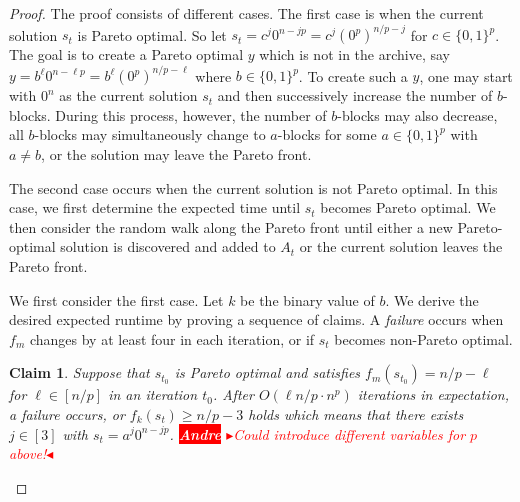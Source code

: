 \documentclass[
sigconf = false, %
review = false, %
screen = true, %
anonymous = true, %
format=acmsmall
]{acmart}
\newtheorem{claim}{Claim}
\newcommand{\nbc}[3]{
		{\colorbox{#3}{\bfseries\sffamily\scriptsize\textcolor{white}{#1}}}
		{\textcolor{#3}{\sf\small$\blacktriangleright$\textit{#2}$\blacktriangleleft$}}
}
\newcommand{\andre}[1]{\nbc{Andre}{#1}{red}}
\begin{document}
\begin{proof}
The proof consists of different cases. The first case is when the current solution $s_t$ is Pareto optimal. So let $s_t= c^j0^{n-j p} = c^j(0^p)^{n/p-j}$ for $c \in \{0,1\}^p$. The goal is to create a Pareto optimal $y$ which is not in the archive, say $y= b^{\ell}0^{n-\ell p} = b^{\ell}(0^p)^{n/p-\ell}$ where $b \in \{0,1\}^p$. To create such a $y$, one may start with $0^n$ as the current solution $s_t$ and then successively increase the number of $b$-blocks. During this process, however, the number of $b$-blocks may also decrease, all $b$-blocks may simultaneously change to $a$-blocks for some $a \in \{0,1\}^p$ with $a \neq b$, or the solution may leave the Pareto front.

The second case occurs when the current solution is not Pareto optimal. In this case, we first determine the expected time until $s_t$ becomes Pareto optimal. We then consider the random walk along the Pareto front until either a new Pareto-optimal solution is discovered and added to $A_t$ or the current solution leaves the Pareto front. 

We first consider the first case. Let $k$ be the binary value of $b$. We derive the desired expected runtime by proving a sequence of claims. A \emph{failure} occurs when $f_m$ changes by at least four in each iteration, or if $s_t$ becomes non-Pareto optimal. 

\begin{claim}
    \label{cl:reachalmostzero}
    Suppose that $s_{t_0}$ is Pareto optimal and satisfies $f_m(s_{t_0})=n/p-\ell$ for $\ell \in [n/p]$ in an iteration $t_0$. After $O(\ell n/p \cdot n^p)$ iterations in expectation, a failure occurs, or $f_k(s_t) \geq n/p-3$ holds which means that there exists $j \in [3]$ with $s_t=a^j 0^{n-jp}$. \andre{Could introduce different variables for $p$ above!}
\end{claim}
    

\end{proof}
\end{document}

